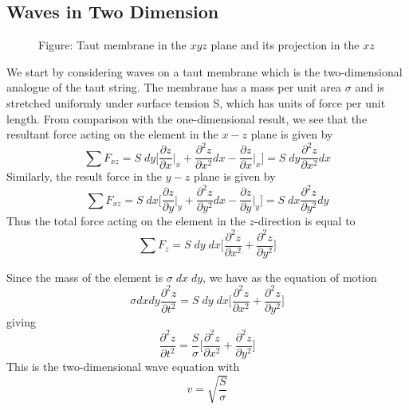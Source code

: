 \documentclass[../../../main.tex]{subfiles}
\begin{document}
\subsection*{Waves in Two Dimension}
\begin{figure*}
    \centering
    \caption*{Figure: Taut membrane in the $xyz$ plane and its projection in the $xz$}
\end{figure*}
We start by considering waves on a taut membrane which is the two-dimensional analogue of the taut string. The membrane has a mass per unit area $\sigma$ and is stretched uniformly under surface tension S, which has units of force per unit length. From comparison with the one-dimensional result, we see that the resultant force acting on the element in the $x-z$ plane is given by
\begin{equation*}
    \sum F_{xz}=S\;dy\biggl[\frac{\partial z}{\partial x}\bigg|_x+\frac{\partial^2 z}{\partial x^2}dx-\frac{\partial z}{\partial x}\bigg|_x\biggr]=S\;dy\frac{\partial^2 z}{\partial x^2}dx
\end{equation*}
Similarly, the result force in the $y-z$ plane is given by
\begin{equation*}
    \sum F_{xz}=S\;dx\biggl[\frac{\partial z}{\partial y}\bigg|_y+\frac{\partial^2 z}{\partial y^2}dx-\frac{\partial z}{\partial y}\bigg|_y\biggr]=S\;dx\frac{\partial^2 z}{\partial y^2}dy    
\end{equation*}
Thus the total force acting on the element in the $z$-direction is equal to
\begin{equation*}
    \sum F_z=S\;dy\;dx\biggl[\frac{\partial^2 z}{\partial x^2}+\frac{\partial^2 z}{\partial y^2}\biggr]
\end{equation*}

Since the mass of the element is $\sigma\;dx\;dy$, we have as the equation of motion
\begin{equation*}
    \sigma dx dy \frac{\partial^2 z}{\partial t^2}=S\;dy\;dx\biggl[\frac{\partial^2 z}{\partial x^2}+\frac{\partial^2 z}{\partial y^2}\biggr]
\end{equation*}
giving
\begin{equation*}
    \frac{\partial^2 z}{\partial t^2}=\frac{S}{\sigma}\biggl[\frac{\partial^2 z}{\partial x^2}+\frac{\partial^2 z}{\partial y^2}\biggr]
\end{equation*}
This is the two-dimensional wave equation with
\begin{equation*}
    v=\sqrt{\frac{S}{\sigma}}
\end{equation*}
\end{document}
